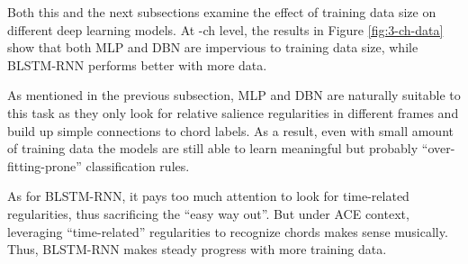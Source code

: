 Both this and the next subsections examine the effect of training data size on different deep learning models. At -ch level, the results in Figure \ref{fig:3-ch-data} show that both MLP and DBN are impervious to training data size, while BLSTM-RNN performs better with more data.

As mentioned in the previous subsection, MLP and DBN are naturally suitable to this task as they only look for relative salience regularities in different frames and build up simple connections to chord labels. As a result, even with small amount of training data the models are still able to learn meaningful but probably ``over-fitting-prone'' classification rules.


As for BLSTM-RNN, it pays too much attention to look for time-related regularities, thus sacrificing the ``easy way out''. But under ACE context, leveraging ``time-related'' regularities to recognize chords makes sense musically. Thus, BLSTM-RNN makes steady progress with more training data.

\label{sec:3-p6}


